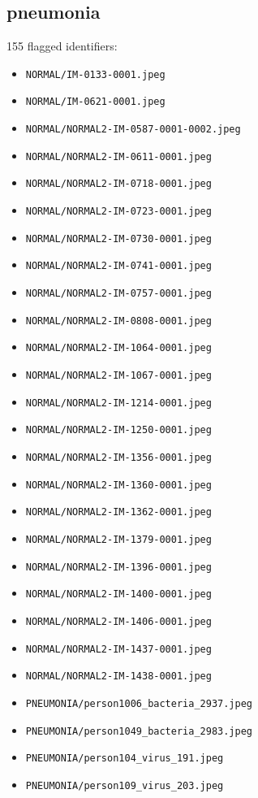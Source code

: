 \subsection*{pneumonia}
155 flagged identifiers:
\begin{itemize}
\item \texttt{NORMAL/IM-0133-0001.jpeg}
\item \texttt{NORMAL/IM-0621-0001.jpeg}
\item \texttt{NORMAL/NORMAL2-IM-0587-0001-0002.jpeg}
\item \texttt{NORMAL/NORMAL2-IM-0611-0001.jpeg}
\item \texttt{NORMAL/NORMAL2-IM-0718-0001.jpeg}
\item \texttt{NORMAL/NORMAL2-IM-0723-0001.jpeg}
\item \texttt{NORMAL/NORMAL2-IM-0730-0001.jpeg}
\item \texttt{NORMAL/NORMAL2-IM-0741-0001.jpeg}
\item \texttt{NORMAL/NORMAL2-IM-0757-0001.jpeg}
\item \texttt{NORMAL/NORMAL2-IM-0808-0001.jpeg}
\item \texttt{NORMAL/NORMAL2-IM-1064-0001.jpeg}
\item \texttt{NORMAL/NORMAL2-IM-1067-0001.jpeg}
\item \texttt{NORMAL/NORMAL2-IM-1214-0001.jpeg}
\item \texttt{NORMAL/NORMAL2-IM-1250-0001.jpeg}
\item \texttt{NORMAL/NORMAL2-IM-1356-0001.jpeg}
\item \texttt{NORMAL/NORMAL2-IM-1360-0001.jpeg}
\item \texttt{NORMAL/NORMAL2-IM-1362-0001.jpeg}
\item \texttt{NORMAL/NORMAL2-IM-1379-0001.jpeg}
\item \texttt{NORMAL/NORMAL2-IM-1396-0001.jpeg}
\item \texttt{NORMAL/NORMAL2-IM-1400-0001.jpeg}
\item \texttt{NORMAL/NORMAL2-IM-1406-0001.jpeg}
\item \texttt{NORMAL/NORMAL2-IM-1437-0001.jpeg}
\item \texttt{NORMAL/NORMAL2-IM-1438-0001.jpeg}
\item \texttt{PNEUMONIA/person1006\_bacteria\_2937.jpeg}
\item \texttt{PNEUMONIA/person1049\_bacteria\_2983.jpeg}
\item \texttt{PNEUMONIA/person104\_virus\_191.jpeg}
\item \texttt{PNEUMONIA/person109\_virus\_203.jpeg}

\end{itemize}
